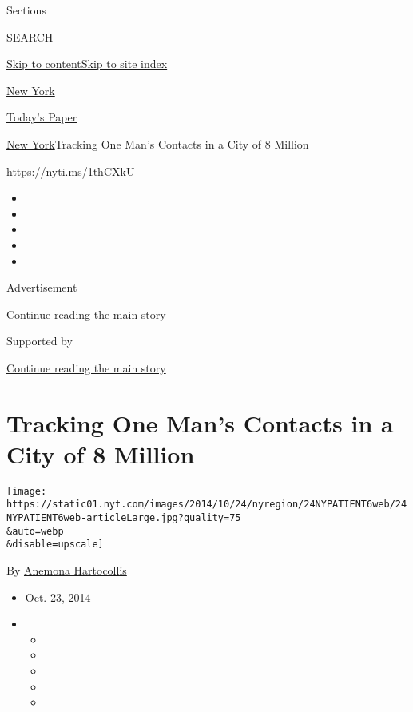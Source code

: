 Sections

SEARCH

\protect\hyperlink{site-content}{Skip to
content}\protect\hyperlink{site-index}{Skip to site index}

\href{https://www.nytimes.com/section/nyregion}{New York}

\href{https://myaccount.nytimes.com/auth/login?response_type=cookie\&client_id=vi}{}

\href{https://www.nytimes.com/section/todayspaper}{Today's Paper}

\href{/section/nyregion}{New York}\textbar{}Tracking One Man's Contacts
in a City of 8 Million

\url{https://nyti.ms/1thCXkU}

\begin{itemize}
\item
\item
\item
\item
\item
\end{itemize}

Advertisement

\protect\hyperlink{after-top}{Continue reading the main story}

Supported by

\protect\hyperlink{after-sponsor}{Continue reading the main story}

\hypertarget{tracking-one-mans-contacts-in-a-city-of-8-million}{%
\section{Tracking One Man's Contacts in a City of 8
Million}\label{tracking-one-mans-contacts-in-a-city-of-8-million}}

\texttt{[image: https://static01.nyt.com/images/2014/10/24/nyregion/24NYPATIENT6web/24NYPATIENT6web-articleLarge.jpg?quality=75\\\&auto=webp\\\&disable=upscale]}

By \href{http://www.nytimes.com/by/anemona-hartocollis}{Anemona
Hartocollis}

\begin{itemize}
\item
  Oct. 23, 2014
\item
  \begin{itemize}
  \item
  \item
  \item
  \item
  \item
  \end{itemize}
\end{itemize}

